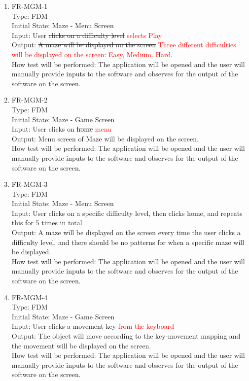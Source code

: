 \documentclass[12pt, titlepage]{article}
\begin{document}
\begin{enumerate}

\item{FR-MGM-1\\}
Type: FDM\\
Initial State: Maze - Menu Screen\\
Input: User \sout{clicks on a difficulty level} \textcolor{red}{selects Play}\\
Output: \sout{A maze will be displayed on the screen} \textcolor{red}{Three different difficulties will be displayed on the screen: Easy, Medium. Hard}.\\
How test will be performed: The application will be opened and the user will manually provide inputs to the software and observes for the output of the software on the screen.\\

\item{FR-MGM-2\\}
Type: FDM\\
Initial State: Maze - Game Screen\\
Input: User clicks on \sout{home} \textcolor{red}{menu}\\
Output: Menu screen of Maze will be displayed on the screen.\\
How test will be performed: The application will be opened and the user will manually provide inputs to the software and observes for the output of the software on the screen.\\

\item{FR-MGM-3\\}
Type: FDM\\
Initial State: Maze - Menu Screen\\
Input: User clicks on a specific difficulty level, then clicks home, and repeats this for 5 times in total\\
Output: A maze will be displayed on the screen every time the user clicks a difficulty level, and there should be no patterns for when a specific maze will be displayed.\\
How test will be performed: The application will be opened and the user will manually provide inputs to the software and observes for the output of the software on the screen.\\

\item{FR-MGM-4\\}
Type: FDM\\
Initial State: Maze - Game Screen\\
Input: User clicks a movement key \textcolor{red}{from the keyboard}\\
Output: The object will move according to the key-movement mapping and the movement will be displayed on the screen.\\
How test will be performed: The application will be opened and the user will manually provide inputs to the software and observes for the output of the software on the screen.\\


\end{enumerate}
\end{document}
